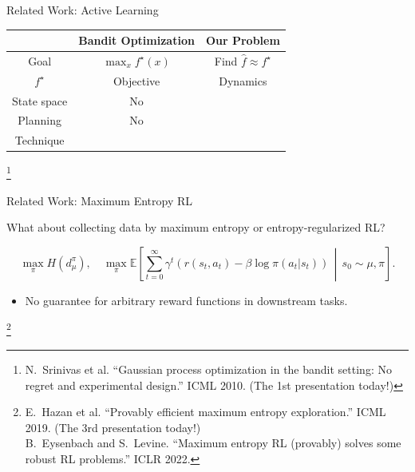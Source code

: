 \documentclass[11pt,aspectratio=169]{beamer}
\newcommand\reffootnote[1]{%
\begingroup
\renewcommand\thefootnote{}\footnote{\hspace{-20px}\color{DarkGray}#1\vspace{5px}}%
\addtocounter{footnote}{-1}%
\endgroup
}
\begin{document}
\begin{frame}{Related Work: Active Learning}
    \renewcommand{\arraystretch}{1.25}
    \begin{table}[h]
        \centering
        \begin{tabular}{c|c|c}
        \toprule
          & Bandit Optimization & Our Problem \\
        \midrule
          Goal & $\displaystyle\max_{x} f^\star(x)$ & Find $\hat{f}\approx f^\star$ \\
          $f^\star$ & Objective & Dynamics \\
          State space & No & \color{ETHRed}{Continuous} \\
          Planning & No & \color{ETHRed}{Yes} \\
          Technique & \multicolumn{2}{c}{\color{ETHRed}{Optimism in the face of uncertainty}} \\
        \bottomrule
        \end{tabular}
    \end{table}

    \reffootnote{N.~Srinivas et al. ``Gaussian process optimization in the bandit setting: No regret and experimental design.'' ICML 2010. (The 1st presentation today!)}
\end{frame}


\begin{frame}{Related Work: Maximum Entropy RL}

    What about collecting data by maximum entropy or entropy-regularized RL?
    
    $$
    \max_{\pi} H\left(d^{\pi}_\mu\right), \quad
        \max_{\pi} \mathbb{E}\left[ \sum_{t=0}^\infty \gamma^t (r(s_t, a_t) - \beta\log\pi(a_t|s_t)) \,\middle|\, s_0\sim \mu , \pi \right].
    $$
    
    \begin{itemize}
        \item \textcolor{ETHRed}{No guarantee} for arbitrary reward functions in downstream tasks.
    \end{itemize}

    \reffootnote{E.~Hazan et al. ``Provably efficient maximum entropy exploration.'' ICML 2019. (The 3rd presentation today!)\\
    B.~Eysenbach and S.~Levine. ``Maximum entropy RL (provably) solves some robust RL problems.'' ICLR 2022.}
\end{frame}
\end{document}
